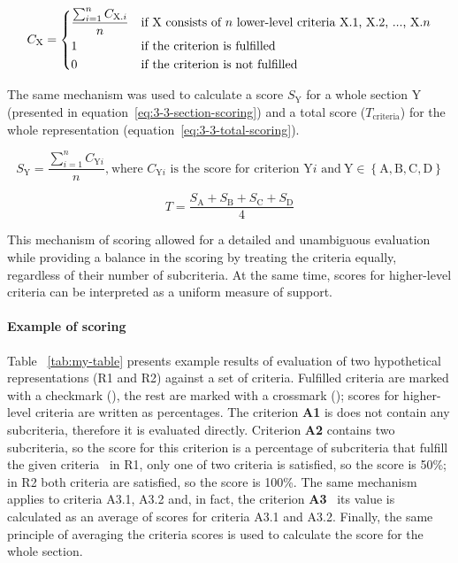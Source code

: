 \begin{equation}
    C_\text{X} =
\begin{dcases}
    \frac{\sum_{i=1}^{n} C_{\text{X.$i$}}}{n} & \text{if X consists of $n$ lower-level criteria X.1, X.2, ..., X.$n$}\\
    1                                         & \text{if the criterion is fulfilled}\\
    0                                         & \text{if the criterion is not fulfilled}
\end{dcases}
    \label{eq:3-3-criterion-scoring}
\end{equation}

The same mechanism was used to calculate a score $S_{\text{Y}}$ for a whole section Y (presented in equation~\ref{eq:3-3-section-scoring}) and a total score ($T_{\text{criteria}}$) for the whole representation (equation~\ref{eq:3-3-total-scoring}).

\begin{equation}
    S_{\text{Y}} = \frac{\sum_{i=1}^{n} C_{\text{Y$i$}}}{n}\text{,}\ \text{where $C_{\text{Y$i$}}$ is the score for criterion Y$i$ and}\ \text{Y} \in \left\{\text{A}, \text{B}, \text{C}, \text{D} \right\}
    \label{eq:3-3-section-scoring}
\end{equation}

\begin{equation}
    T = \frac{S_{\text{A}} + S_{\text{B}} + S_{\text{C}} + S_{\text{D}}}{4}
    \label{eq:3-3-total-scoring}
\end{equation}

This mechanism of scoring allowed for a detailed and unambiguous evaluation while providing a balance in the scoring by treating the criteria equally, regardless of their number of subcriteria.
At the same time, scores for higher-level criteria can be interpreted as a uniform measure of support.

\paragraph{Example of scoring}
Table ~\ref{tab:my-table} presents example results of evaluation of two hypothetical representations (R1 and R2) against a set of criteria.
Fulfilled criteria are marked with a checkmark (\cmark), the rest are marked with a crossmark (\xmark);
scores for higher-level criteria are written as percentages.
The criterion \textbf{A1} is does not contain any subcriteria, therefore it is evaluated directly.
Criterion \textbf{A2} contains two subcriteria, so the score for this criterion is a percentage of subcriteria that fulfill the given criteria \textendash\ in R1, only one of two criteria is satisfied, so the score is 50\%; in R2 both criteria are satisfied, so the score is 100\%.
The same mechanism applies to criteria A3.1, A3.2 and, in fact, the criterion \textbf{A3} \textendash\ its value is calculated as an average of scores for criteria A3.1 and A3.2.
Finally, the same principle of averaging the criteria scores is used to calculate the score for the whole section.

